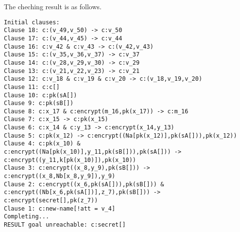 \documentclass[a4paper, 12pt]{report}
\begin{document}
        The cheching result is as follows.
        \begin{lstlisting}[frame=single]
Initial clauses:
Clause 18: c:(v_49,v_50) -> c:v_50
Clause 17: c:(v_44,v_45) -> c:v_44
Clause 16: c:v_42 & c:v_43 -> c:(v_42,v_43)
Clause 15: c:(v_35,v_36,v_37) -> c:v_37
Clause 14: c:(v_28,v_29,v_30) -> c:v_29
Clause 13: c:(v_21,v_22,v_23) -> c:v_21
Clause 12: c:v_18 & c:v_19 & c:v_20 -> c:(v_18,v_19,v_20)
Clause 11: c:c[]
Clause 10: c:pk(sA[])
Clause 9: c:pk(sB[])
Clause 8: c:x_17 & c:encrypt(m_16,pk(x_17)) -> c:m_16
Clause 7: c:x_15 -> c:pk(x_15)
Clause 6: c:x_14 & c:y_13 -> c:encrypt(x_14,y_13)
Clause 5: c:pk(x_12) -> c:encrypt((Na[pk(x_12)],pk(sA[])),pk(x_12))
Clause 4: c:pk(x_10) & c:encrypt((Na[pk(x_10)],y_11,pk(sB[])),pk(sA[])) -> c:encrypt((y_11,k[pk(x_10)]),pk(x_10))
Clause 3: c:encrypt((x_8,y_9),pk(sB[])) -> c:encrypt((x_8,Nb[x_8,y_9]),y_9)
Clause 2: c:encrypt((x_6,pk(sA[])),pk(sB[])) & c:encrypt((Nb[x_6,pk(sA[])],z_7),pk(sB[])) -> c:encrypt(secret[],pk(z_7))
Clause 1: c:new-name[!att = v_4]
Completing...
RESULT goal unreachable: c:secret[]
        \end{lstlisting}
\end{document}
